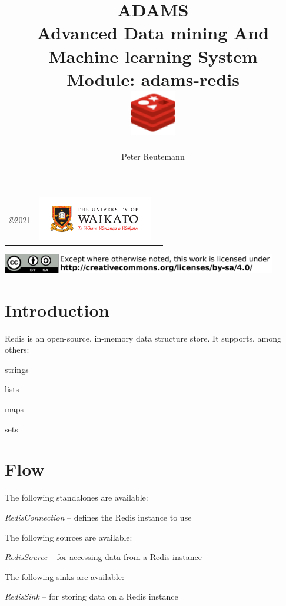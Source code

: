 \documentclass[a4paper]{book}
\title{
  \textbf{ADAMS} \\
  {\Large \textbf{A}dvanced \textbf{D}ata mining \textbf{A}nd \textbf{M}achine
  learning \textbf{S}ystem} \\
  {\Large Module: adams-redis} \\
  \vspace{1cm}
  \includegraphics[width=2cm]{images/redis-module.png} \\
}
\author{
  Peter Reutemann
}
\begin{document}
\begin{titlepage}
\maketitle

\thispagestyle{empty}
\center
\begin{table}[b]
	\begin{tabular}{c l l}
		\parbox[c][2cm]{2cm}{\copyright 2021} &
		\parbox[c][2cm]{5cm}{\includegraphics[width=5cm]{images/coat_of_arms.pdf}} \\
	\end{tabular}
	\includegraphics[width=12cm]{images/cc.png} \\
\end{table}

\end{titlepage}

\tableofcontents

\chapter{Introduction}
Redis\cite{redis} is an open-source, in-memory data structure store. It supports, among others:
\begin{tight_itemize}
  \item strings
  \item lists
  \item maps
  \item sets
\end{tight_itemize}

\chapter{Flow}
The following standalones are available:
\begin{tight_itemize}
  \item \textit{RedisConnection} -- defines the Redis instance to use
\end{tight_itemize}

\noindent The following sources are available:
\begin{tight_itemize}
  \item \textit{RedisSource} -- for accessing data from a Redis instance
\end{tight_itemize}

\noindent The following sinks are available:
\begin{tight_itemize}
  \item \textit{RedisSink} -- for storing data on a Redis instance
\end{tight_itemize}


\end{document}
